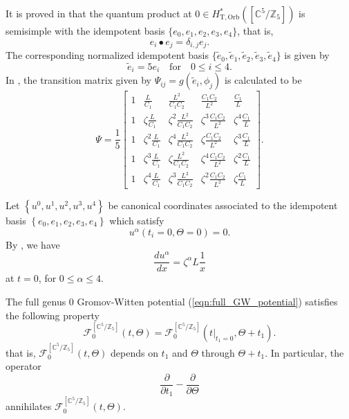 \documentclass[12pt]{amsart}
\numberwithin{equation}{section}
\begin{document}
It is proved in \cite[Section 5]{lho} that the quantum product at $0\in H^{*}_{\mathrm{T,Orb}}\left(\left[\mathbb{C}^5/\mathbb{Z}_5\right]\right)$ is semisimple with the idempotent basis $\{e_0,e_1, e_2, e_3 ,e_4\}$, that is,
\begin{equation*}
e_i\bullet e_j=\delta_{i,j}e_j.
\end{equation*}
The corresponding normalized idempotent basis $\{\widetilde{e}_0,\widetilde{e}_1, \widetilde{e}_2, \widetilde{e}_3,\widetilde{e}_4\}$ is given by
\begin{equation*}
\widetilde{e}_i=5e_i\quad\text{for}\quad 0\leq{i}\leq{4}.
\end{equation*}
In \cite[Section 5]{lho}, the transition matrix given by $\Psi_{ij}=g(\widetilde{e}_i,\phi_j)$ is calculated to be
\begin{equation*}
\Psi=\frac{1}{5}
\begin{bmatrix}
1 & \frac{L}{C_1} & \frac{L^2}{C_1 C_2} & \frac{C_1 C_2}{L^2} & \frac{C_1}{L} \\
1 & \zeta \frac{L}{C_1} & \zeta^2 \frac{L^2}{C_1 C_2} & \zeta^3 \frac{C_1 C_2}{L^2} & \zeta^4 \frac{C_1}{L} \\
1 & \zeta^2 \frac{L}{C_1} & \zeta^4 \frac{L^2}{C_1 C_2} & \zeta \frac{C_1 C_2}{L^2} & \zeta^3 \frac{C_1}{L} \\
1 & \zeta^3 \frac{L}{C_1} & \zeta \frac{L^2}{C_1 C_2} & \zeta^4 \frac{C_1 C_2}{L^2} & \zeta^2 \frac{C_1}{L} \\
1 & \zeta^4 \frac{L}{C_1} & \zeta^3 \frac{L^2}{C_1 C_2} & \zeta^2 \frac{C_1 C_2}{L^2} & \zeta \frac{C_1}{L}
\end{bmatrix}.
\end{equation*}

Let $\left\{u^{0},u^1, u^2, u^3,u^{4}\right\}$ be canonical coordinates associated to the idempotent basis $\left\{e_{0},e_1, e_2, e_3, e_{4}\right\}$ which satisfy
\begin{equation*}
u^{\alpha}\left(t_i=0,\Theta=0\right)=0.
\end{equation*}
By \cite[Lemma 6]{lho}, we have
\begin{equation}\label{canonicalcoorder2}
\frac{du^{\alpha}}{dx}=\zeta^{\alpha}L\frac{1}{x}
\end{equation}
at $t=0$, for $0\leq\alpha\leq{4}$.

The full genus $0$ Gromov-Witten potential (\ref{eqn:full_GW_potential}) satisfies the following property
\begin{equation*}
    \mathcal{F}_0^{\left[\mathbb{C}^5 / \mathbb{Z}_5\right]}(t, \Theta)=\mathcal{F}_0^{\left[\mathbb{C}^5 / \mathbb{Z}_5\right]}(t|_{t_1=0}, \Theta+t_1).
\end{equation*}
that is, $\mathcal{F}_0^{\left[\mathbb{C}^5 / \mathbb{Z}_5\right]}(t, \Theta)$ depends on $t_1$ and $\Theta$ through $\Theta+t_1$. In particular, the operator
\begin{equation}\label{annihilatoroperator}
\frac{\partial}{\partial{t_1}}-\frac{\partial}{\partial\Theta}
\end{equation}
annihilates $\mathcal{F}_0^{\left[\mathbb{C}^5 / \mathbb{Z}_5\right]}(t, \Theta)$.
\end{document}
